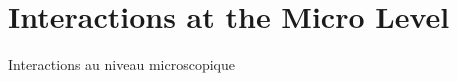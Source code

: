 




\chapter{Interactions at the Micro Level}{Interactions au niveau microscopique} %

\label{ch:micro} %



\headercit{}{}{}


\bigskip

























